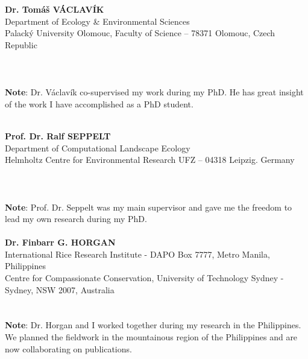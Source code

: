 

\begin{cvparagraph}

 \vspace{.5\baselineskip} 

\textbf{Dr. Tomáš VÁCLAVÍK}\\
Department of Ecology \& Environmental Sciences\\
Palacký University Olomouc,  Faculty of Science – 78371 Olomouc, Czech Republic\\
\faEnvelope\hspace{.3\baselineskip}{tomas.vaclavik@upol.cz}\\
\faMobile\hspace{0.7\baselineskip}{(+420) 585 634 555}\\
\\
\textbf{Note}: Dr. Václavík co-supervised my work during my PhD. He has great insight of the work I have accomplished as a PhD student.\\
\\
 \vspace{5\baselineskip} 
 
\textbf{Prof. Dr. Ralf SEPPELT}\\
Department of Computational Landscape Ecology\\
Helmholtz Centre for Environmental Research UFZ – 04318 Leipzig. Germany\\
\faEnvelope\hspace{.3\baselineskip}{ralf.seppelt@ufz.de}\\
\faMobile\hspace{0.7\baselineskip}{(+49) 341 235 1250}\\
\\
\textbf{Note}: Prof. Dr. Seppelt was my main supervisor and gave me the freedom to lead my own research during my PhD.\\
\\
\textbf{Dr. Finbarr G. HORGAN}\\
International Rice Research Institute - DAPO Box 7777, Metro Manila, Philippines\\
Centre for Compassionate Conservation, University of Technology Sydney - Sydney, NSW 2007, Australia\\
\faEnvelope\hspace{.3\baselineskip}{Finbarr.Horgan@uts.edu.au}\\
\\
\textbf{Note}: Dr. Horgan and I worked together during my research in the Philippines. We planned the fieldwork in the mountainous region of the Philippines and are now collaborating on publications.
\\

\end{cvparagraph}


